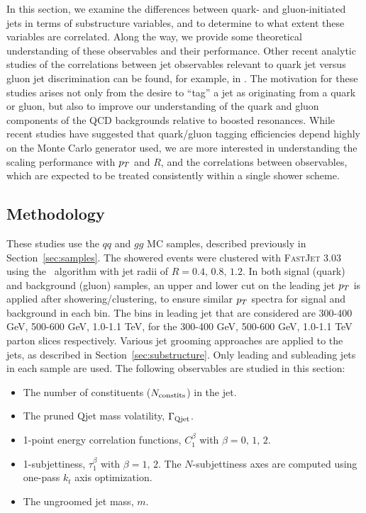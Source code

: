 In this section, we examine the differences between quark- and
gluon-initiated jets in terms of substructure variables, and to
determine to what extent these variables are correlated. Along the
way, we provide some theoretical understanding of these
observables and their performance. 
Other recent analytic studies of the correlations between jet observables
relevant to quark jet versus gluon jet discrimination can be found, for example, in
\cite{Larkoski:2013paa, Larkoski:2014tva, Larkoski:2014pca, Procura:2014cba}.
The motivation for these studies
arises not only from the
desire to ``tag'' a jet as originating from a quark or gluon, but also
to improve our  understanding of the quark and gluon components of the
QCD backgrounds relative to boosted resonances.  While recent studies
have suggested that quark/gluon tagging efficiencies depend highly on
the Monte Carlo generator used\cite{Aad:2014gea,Gallicchio:2012ez}, we are more interested in
understanding the scaling performance with $p_T$ and $R$, and the
correlations between observables, which are expected to be treated
consistently within a single shower scheme.

\subsection{Methodology}

These studies use the $qq$ and $gg$ MC samples, described previously in Section~\ref{sec:samples}. 
The showered events were clustered with \textsc{FastJet}
3.03 using
the \antikt~algorithm with jet radii of $R = 0.4,\, 0.8,\, 1.2$. In
both signal (quark) and background (gluon) samples, an upper and lower cut on
the leading jet $p_T$ is applied after showering/clustering, to ensure
similar $p_T$ spectra for signal and background in each \pt bin. The bins
in leading jet \pt that are considered are 300-400 GeV, 500-600 GeV,
1.0-1.1 TeV, for the 300-400 GeV, 500-600 GeV,
1.0-1.1 TeV parton \pt slices respectively. 
Various jet grooming approaches are applied to the jets, as described in Section~\ref{sec:substructure}. 
Only leading and subleading jets in each sample are used. The
following observables are studied in this section:

\begin{itemize}
\item The number of constituents ($N_{\rm constits}$) in the jet.
\item The pruned Qjet mass volatility, $\Gamma_{\rm Qjet}$.
\item 1-point energy correlation functions, $C_1^{\beta}$ with $\beta=0,\,1,\,2$.
\item 1-subjettiness, $\tau_1^{\beta}$ with $\beta=1,\,2$. The $N$-subjettiness axes are computed using one-pass $k_t$ axis optimization.
\item The ungroomed jet mass,  $m$.
\end{itemize}

